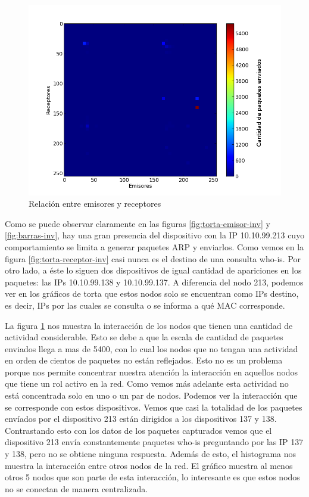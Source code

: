 \begin{figure}[!h]
  \includegraphics[width=\textwidth,keepaspectratio]{graph/hist2d-invgate.png}
  \caption{Relación entre emisores y receptores}
  \label{fig:hist2d-inv}
\end{figure}

Como se puede observar claramente en las figuras \ref{fig:torta-emisor-inv} y  
\ref{fig:barras-inv}, hay una gran presencia del dispositivo con la IP 10.10.99.213 cuyo comportamiento se limita a generar paquetes ARP y enviarlos. Como vemos en la figura \ref{fig:torta-receptor-inv} casi nunca es el destino de una consulta who-is. Por otro lado, a éste lo siguen dos dispositivos de igual cantidad de apariciones en los paquetes: las IPs 10.10.99.138 y 10.10.99.137. A diferencia del nodo 213, podemos ver en los gráficos de torta que estos nodos solo se encuentran como IPs destino, es decir, IPs por las cuales se consulta o se informa a qué MAC corresponde.

La figura \ref{fig:hist2d-inv} nos muestra la interacción de los nodos que tienen una cantidad de actividad considerable. Esto se debe a que la escala de cantidad de paquetes enviados llega a mas de 5400, con lo cual los nodos que no tengan una actividad en orden de cientos de paquetes no están reflejados. Esto no es un problema porque nos permite concentrar nuestra atención la interacción en aquellos nodos que tiene un rol activo en la red. Como vemos más adelante esta actividad no está concentrada solo en uno o un par de nodos.
Podemos ver la interacción que se corresponde con estos dispositivos. Vemos que casi la totalidad de los paquetes envíados por el dispositivo 213 están dirigidos a los dispositivos 137 y 138.  Contrastando esto con los datos de los paquetes capturados vemos que el dispositivo 213 envía constantemente paquetes who-is preguntando por las IP 137 y 138, pero no se obtiene ninguna respuesta.
Además de esto, el histograma nos muestra la interacción entre otros nodos de la red. El gráfico muestra al menos otros 5 nodos que son parte de esta interacción, lo interesante es que estos nodos no se conectan de manera centralizada.

